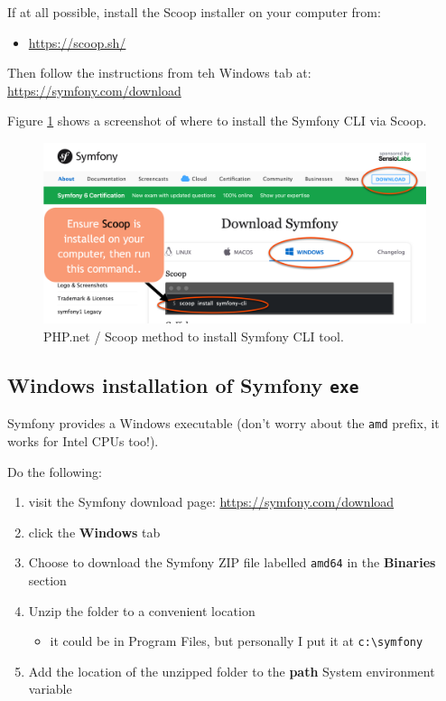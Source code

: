 \documentclass[a4paperpaper,openright]{book}
\providecommand{\tightlist}{%
  \setlength{\itemsep}{0pt}\setlength{\parskip}{0pt}}
\begin{document}
If at all possible, install the Scoop installer on your computer from:

\begin{itemize}
\tightlist
\item
  \url{https://scoop.sh/}
\end{itemize}

Then follow the instructions from teh Windows tab at:
\url{https://symfony.com/download}

Figure \ref{windows_scoop} shows a screenshot of where to install the
Symfony CLI via Scoop.

\begin{figure}
\centering
\includegraphics{./tex2pdf.-564b08cce17d66dc/f84030042d4677a9d8fe8e9ddf066bbbab7d73f7.png}
\caption{PHP.net / Scoop method to install Symfony CLI tool.
\label{windows_scoop}}
\end{figure}

\hypertarget{windows-installation-of-symfony-exe}{%
\subsection{\texorpdfstring{Windows installation of Symfony
\texttt{exe}}{Windows installation of Symfony exe}}\label{windows-installation-of-symfony-exe}}

Symfony provides a Windows executable (don't worry about the
\texttt{amd} prefix, it works for Intel CPUs too!).

Do the following:

\begin{enumerate}
\def\labelenumi{\arabic{enumi}.}
\item
  visit the Symfony download page: \url{https://symfony.com/download}
\item
  click the \textbf{Windows} tab
\item
  Choose to download the Symfony ZIP file labelled \texttt{amd64} in the
  \textbf{Binaries} section
\item
  Unzip the folder to a convenient location

  \begin{itemize}
  \tightlist
  \item
    it could be in Program Files, but personally I put it at
    \texttt{c:\textbackslash{}symfony}
  \end{itemize}
\item
  Add the location of the unzipped folder to the \textbf{path} System
  environment variable
\end{enumerate}
\end{document}
